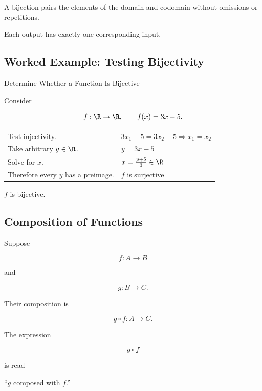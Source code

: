 A bijection pairs the elements of the domain and codomain without omissions
or repetitions.

Each output has exactly one corresponding input.

\subsection{Worked Example: Testing Bijectivity}
\label{subsec:worked-bijectivity}

\begin{workedexamplebox}{Determine Whether a Function Is Bijective}

Consider

\[ f:\R\to\R,\qquad f(x)=3x-5. \]

\begin{tabularx}{\textwidth}{@{}>{\raggedright\arraybackslash}p{}X@{}}
Test injectivity. & \(3x_1-5=3x_2-5\Rightarrow x_1=x_2\)\\
Take arbitrary \(y\in\R\). & \(y=3x-5\)\\
Solve for \(x\). & \(x=\frac{y+5}{3}\in\R\)\\
Therefore every \(y\) has a preimage. & \(f\) is surjective
\end{tabularx}

\begin{answerbox}
\(f\) is bijective.
\end{answerbox}
\end{workedexamplebox}

\subsection{Composition of Functions}
\label{subsec:function-composition}

Suppose

\[ f:A\to B \]

and

\[ g:B\to C. \]

Their composition is

\[ g\circ f:A\to C. \]

The expression

\[ g\circ f \]

is read

\begin{center}
``\(g\) composed with \(f\).''
\end{center}


